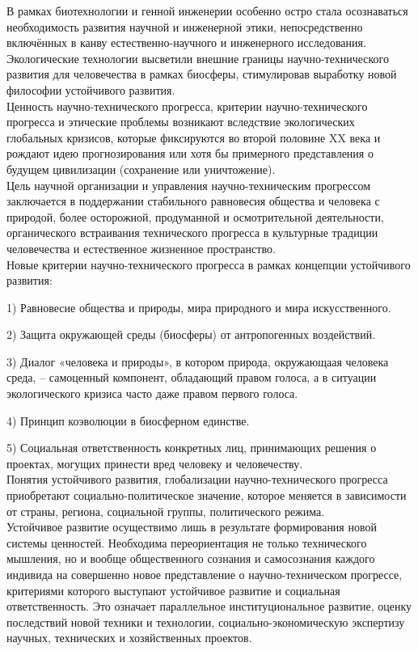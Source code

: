 \documentclass[exam_answers.tex]{subfiles}
\begin{document}
\renewcommand{\baselinestretch}{\blch}

В рамках биотехнологии и генной инженерии особенно остро стала осознаваться необходимость развития научной и инженерной этики, непосредственно включённых в канву естественно-научного и инженерного исследования.
Экологические технологии высветили внешние границы научно-технического развития для человечества в рамках биосферы, стимулировав выработку новой философии устойчивого развития.
\\

Ценность научно-технического прогресса, критерии научно-технического прогресса и этические проблемы возникают вследствие экологических глобальных кризисов, которые фиксируются во второй половине XX века и рождают идею прогнозирования или хотя бы примерного представления о будущем цивилизации (сохранение или уничтожение).
\\

Цель научной организации и управления научно-техническим прогрессом заключается в поддержании стабильного равновесия общества и человека с природой, более осторожной, продуманной и осмотрительной деятельности, органического встраивания технического прогресса в культурные традиции человечества и естественное жизненное пространство.
\\

Новые критерии научно-технического прогресса в рамках концепции устойчивого развития:

1) Равновесие общества и природы, мира природного и мира искусственного.

2) Защита окружающей среды (биосферы) от антропогенных воздействий.

3) Диалог «человека и природы», в котором природа, окружающаая человека среда, -- самоценный компонент, обладающий правом голоса, а в ситуации экологического кризиса часто даже правом первого голоса.

4) Принцип коэволюции в биосферном единстве.

5) Социальная ответственность конкретных лиц, принимающих решения о проектах, могущих принести вред человеку и человечеству.
\\

Понятия устойчивого развития, глобализации научно-технического прогресса приобретают социально-политическое значение, которое меняется в зависимости от страны, региона, социальной группы, политического режима.
\\

Устойчивое развитие осуществимо лишь в результате формирования новой системы ценностей.
Необходима переориентация не только технического мышления, но и вообще общественного сознания и самосознания каждого индивида на совершенно новое представление о научно-техническом прогрессе, критериями которого выступают устойчивое развитие и социальная ответственность.
Это означает параллельное институциональное развитие, оценку последствий новой техники и технологии, социально-экономическую экспертизу научных, технических и хозяйственных проектов.
\end{document}
